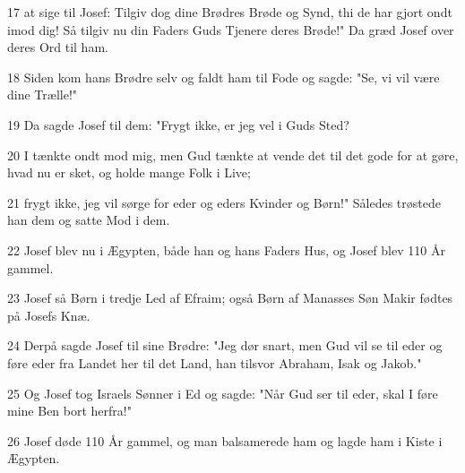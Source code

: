 \par 17 at sige til Josef: Tilgiv dog dine Brødres Brøde og Synd, thi de har gjort ondt imod dig! Så tilgiv nu din Faders Guds Tjenere deres Brøde!" Da græd Josef over deres Ord til ham.
\par 18 Siden kom hans Brødre selv og faldt ham til Fode og sagde: "Se, vi vil være dine Trælle!"
\par 19 Da sagde Josef til dem: "Frygt ikke, er jeg vel i Guds Sted?
\par 20 I tænkte ondt mod mig, men Gud tænkte at vende det til det gode for at gøre, hvad nu er sket, og holde mange Folk i Live;
\par 21 frygt ikke, jeg vil sørge for eder og eders Kvinder og Børn!" Således trøstede han dem og satte Mod i dem.
\par 22 Josef blev nu i Ægypten, både han og hans Faders Hus, og Josef blev 110 År gammel.
\par 23 Josef så Børn i tredje Led af Efraim; også Børn af Manasses Søn Makir fødtes på Josefs Knæ.
\par 24 Derpå sagde Josef til sine Brødre: "Jeg dør snart, men Gud vil se til eder og føre eder fra Landet her til det Land, han tilsvor Abraham, Isak og Jakob."
\par 25 Og Josef tog Israels Sønner i Ed og sagde: "Når Gud ser til eder, skal I føre mine Ben bort herfra!"
\par 26 Josef døde 110 År gammel, og man balsamerede ham og lagde ham i Kiste i Ægypten.



